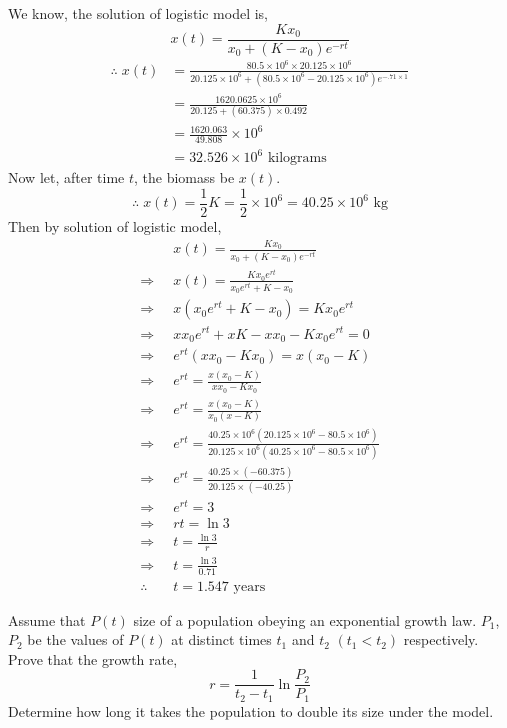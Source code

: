 \documentclass[../main-sheet.tex]{subfiles}
\begin{document}
\begin{soln}
    We know, the solution of logistic model is,
    \[
        x(t)=\frac{K x_0}{x_0+(K-x_0)e^{-rt}}
        \]
        \begin{align*}
            \therefore \;x(t)&=\frac{80.5\times 10^6 \times 20.125\times 10^6}{20.125\times 10^6+(80.5\times 10^6-20.125\times 10^6)e^{-.71\times 1}}\\
            &=\frac{1620.0625\times 10^6}{20.125+(60.375)\times 0.492}\\
            &=\frac{1620.063}{49.808}\times 10^6\\
            &=32.526\times 10^6\text{ kilograms}
        \end{align*}
    Now let, after time \(t\), the biomass be \(x(t)\).
    \[
        \therefore\;x(t)=\frac{1}{2}K=\frac{1}{2}\times 10^6=40.25\times10^6\text{ kg}
    \]
    Then by solution of logistic model,
    \begin{align*}
        &x(t)=\frac{K x_0}{x_0+(K-x_0)e^{-rt}}\\
        \Rightarrow\;\;&x(t)=\frac{K x_0e^{rt}}{x_0e^{rt}+K-x_0}\\
        \Rightarrow\;\;&x\left( {x_0e^{rt}+K-x_0} \right)={K x_0e^{rt}}\\
        \Rightarrow\;\;&xx_0e^{rt}+xK-xx_0-{K x_0e^{rt}}=0\\
        \Rightarrow\;\;&e^{rt}\left(xx_0-{K x_0}\right)=x(x_0-K)\\
        \Rightarrow\;\;&e^{rt}=\frac{x(x_0-K)}{xx_0-{K x_0}}\\
        \Rightarrow\;\;&e^{rt}=\frac{x(x_0-K)}{x_0(x-K)}\\
        \Rightarrow\;\;&e^{rt}=\frac{40.25\times10^6(20.125\times10^6-80.5\times10^6)}{20.125\times10^6(40.25\times10^6-80.5\times10^6)}\\
        \Rightarrow\;\;&e^{rt}=\frac{40.25\times (-60.375)}{20.125\times (-40.25)}\\
        \Rightarrow\;\;&e^{rt}=3\\
        \Rightarrow\;\;&{rt}=\ln 3\\
        \Rightarrow\;\;&{t}=\frac{\ln 3}{r}\\
        \Rightarrow\;\;&{t}=\frac{\ln 3}{0.71}\\
        \therefore\;\;&{t}=1.547 \text{ years}
    \end{align*}
\end{soln}
\begin{prob}
    Assume that \(P(t)\) size of a population obeying an exponential growth law. \(P_1\), \(P_2\) be the values of \(P(t)\) at distinct times \(t_1\) and \(t_2\) \((t_1<t_2)\) respectively. Prove that the growth rate,
    \[r=\frac{1}{t_2-t_1}\ln\frac{P_2}{P_1}
    \]
    Determine how long it takes the population to double its size under the model.
\end{prob}
\end{document}
